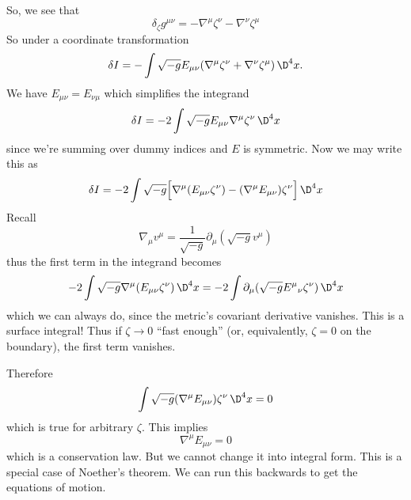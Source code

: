 So, we see that
\begin{equation}
\delta_{\zeta}g^{\mu\nu}=-\nabla^{\mu}\zeta^{\nu}
-\nabla^{\nu}\zeta^{\mu}
\end{equation}
So under a coordinate transformation
\begin{equation}
\delta I=-\int\sqrt{-g}E_{\mu\nu}(\nabla^{\mu}\zeta^{\nu}+\nabla^{\nu}\zeta^{\mu})\,\D^{4}x.
\end{equation}
We have $E_{\mu\nu}=E_{\nu\mu}$ which simplifies the integrand
\begin{equation}
\delta I=-2\int\sqrt{-g}E_{\mu\nu}\nabla^{\mu}\zeta^{\nu}\,\D^{4}x
\end{equation}
since we're summing over dummy indices and $E$ is symmetric. Now
we may write this as
\begin{equation}
\delta I=-2\int\sqrt{-g}\Bigl[
\nabla^{\mu}(E_{\mu\nu}\zeta^{\nu})-(\nabla^{\mu}E_{\mu\nu})\zeta^{\nu}
\Bigr]\,\D^{4}x
\end{equation}
Recall
\begin{equation}
\nabla_{\mu}v^{\mu}=\frac{1}{\sqrt{-g}}\partial_{\mu}(\sqrt{-g}v^{\mu})
\end{equation}
thus the first term in the integrand becomes
\begin{equation}
-2\int\sqrt{-g}\nabla^{\mu}(E_{\mu\nu}\zeta^{\nu})\,\D^{4}x=-2\int\partial_{\mu}(\sqrt{-g}{E^{\mu}}_{\nu}\zeta^{\nu})\,\D^{4}x
\end{equation}
which we can always do, since the metric's covariant derivative
vanishes. This is a surface integral! Thus if $\zeta\to0$ ``fast
enough'' (or, equivalently, $\zeta=0$ on the boundary), the first
term vanishes.

Therefore
\begin{equation}
\int\sqrt{-g}(\nabla^{\mu}E_{\mu\nu})\zeta^{\nu}\,\D^{4}x=0
\end{equation}
which is true for arbitrary $\zeta$. This implies
\begin{equation}
\nabla^{\mu}E_{\mu\nu}=0
\end{equation}
which is a conservation law. But we cannot change it into
integral form. This is a special case of Noether's theorem. We
can run this backwards to get the equations of motion.
